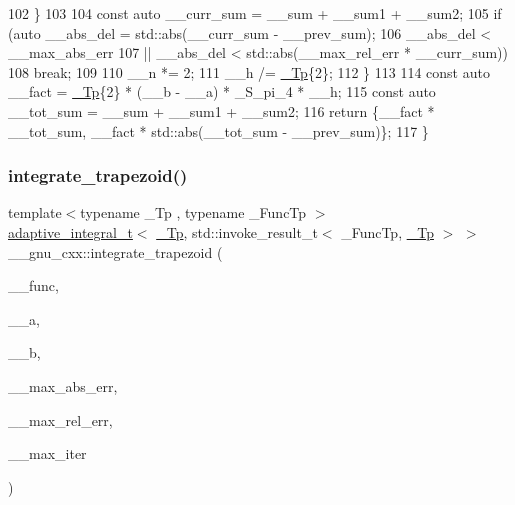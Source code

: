 \begin{DoxyCode}
102             \}
103 
104           \textcolor{keyword}{const} \textcolor{keyword}{auto} \_\_curr\_sum = \_\_sum + \_\_sum1 + \_\_sum2;
105           \textcolor{keywordflow}{if} (\textcolor{keyword}{auto} \_\_abs\_del = std::abs(\_\_curr\_sum - \_\_prev\_sum);
106               \_\_abs\_del < \_\_max\_abs\_err
107               || \_\_abs\_del < std::abs(\_\_max\_rel\_err * \_\_curr\_sum))
108             \textcolor{keywordflow}{break};
109 
110           \_\_n *= 2;
111           \_\_h /= \hyperlink{namespace____gnu__cxx_a3b19a9c800ca194374ef9172290f7d79}{\_Tp}\{2\};
112         \}
113 
114       \textcolor{keyword}{const} \textcolor{keyword}{auto} \_\_fact = \hyperlink{namespace____gnu__cxx_a3b19a9c800ca194374ef9172290f7d79}{\_Tp}\{2\} * (\_\_b - \_\_a) * \_S\_pi\_4 * \_\_h;
115       \textcolor{keyword}{const} \textcolor{keyword}{auto} \_\_tot\_sum = \_\_sum + \_\_sum1 + \_\_sum2;
116       \textcolor{keywordflow}{return} \{\_\_fact * \_\_tot\_sum, \_\_fact * std::abs(\_\_tot\_sum - \_\_prev\_sum)\};
117     \}
\end{DoxyCode}
\mbox{\label{namespace____gnu__cxx_adf9d0d087d69a8a279053edd15487d71}} 
\subsubsection{\texorpdfstring{integrate\+\_\+trapezoid()}{integrate\_trapezoid()}}
{\footnotesize\ttfamily template$<$typename \+\_\+\+Tp , typename \+\_\+\+Func\+Tp $>$ \\
\hyperlink{struct____gnu__cxx_1_1adaptive__integral__t}{adaptive\+\_\+integral\+\_\+t}$<$ \hyperlink{namespace____gnu__cxx_a3b19a9c800ca194374ef9172290f7d79}{\+\_\+\+Tp}, std\+::invoke\+\_\+result\+\_\+t$<$ \+\_\+\+Func\+Tp, \hyperlink{namespace____gnu__cxx_a3b19a9c800ca194374ef9172290f7d79}{\+\_\+\+Tp} $>$ $>$ \+\_\+\+\_\+gnu\+\_\+cxx\+::integrate\+\_\+trapezoid (\begin{DoxyParamCaption}\item[{\+\_\+\+Func\+Tp}]{\+\_\+\+\_\+func,  }\item[{\hyperlink{namespace____gnu__cxx_a3b19a9c800ca194374ef9172290f7d79}{\+\_\+\+Tp}}]{\+\_\+\+\_\+a,  }\item[{\hyperlink{namespace____gnu__cxx_a3b19a9c800ca194374ef9172290f7d79}{\+\_\+\+Tp}}]{\+\_\+\+\_\+b,  }\item[{\hyperlink{namespace____gnu__cxx_a3b19a9c800ca194374ef9172290f7d79}{\+\_\+\+Tp}}]{\+\_\+\+\_\+max\+\_\+abs\+\_\+err,  }\item[{\hyperlink{namespace____gnu__cxx_a3b19a9c800ca194374ef9172290f7d79}{\+\_\+\+Tp}}]{\+\_\+\+\_\+max\+\_\+rel\+\_\+err,  }\item[{int}]{\+\_\+\+\_\+max\+\_\+iter }\end{DoxyParamCaption})\hspace{0.3cm}{\ttfamily [inline]}}



